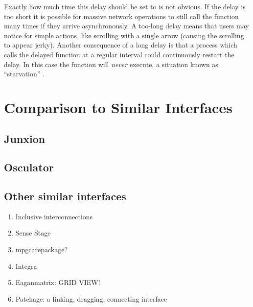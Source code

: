 Exactly how much time this delay should be set to is not obvious. If the delay is too short it is possible for massive network operations to still call the function many times if they arrive asynchronously. A too-long delay means that users may notice for simple actions, like scrolling with a single arrow (causing the scrolling to appear jerky). Another consequence of a long delay is that a process which calls the delayed function at a regular interval could continuously restart the delay. In this case the function will \emph{never} execute, a situation known as ``starvation'' .

	



\section{Comparison to Similar Interfaces} %
\label{sec:comparison_to_similar_interfaces}

	\subsection{Junxion} %
	\label{sub:junxion}
		\cite{junxion}

	\subsection{Osculator} %
	\label{sub:osculator}
		\cite{osculator}

	\subsection{Other similar interfaces} %
	\label{sub:other_similar_interfaces}
	
	\begin{enumerate}
		\item Inclusive interconnections 
		\item Sense Stage 
		\item mpgcarepackage?
		\item Integra 
		\item Eaganmatrix: GRID VIEW! 
		\item Patchage: a linking, dragging, connecting interface 
	\end{enumerate}

